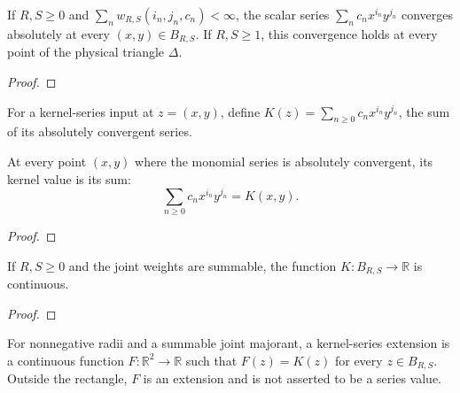 \begin{supporting}
\begin{theorem}
\label{thm:volterra-series-kernel-input}
\leanok
If $R,S\ge0$ and $\sum_n w_{R,S}(i_n,j_n,c_n)<\infty$, the scalar series $\sum_n c_n x^{i_n}y^{j_n}$ converges absolutely at every $(x,y)\in B_{R,S}$.
If $R,S\ge1$, this convergence holds at every point of the physical triangle $\Delta$.
\end{theorem}
\begin{proof}
\leanok
\end{proof}

\begin{definition}
\label{def:volterra-series-kernel}
\leanok
For a kernel-series input at $z=(x,y)$, define
$K(z)=\sum_{n\ge0}c_nx^{i_n}y^{j_n}$, the sum of its absolutely convergent series.
\end{definition}

\begin{theorem}
\label{thm:volterra-series-kernel-value}
\leanok
At every point $(x,y)$ where the monomial series is absolutely convergent,
its kernel value is its sum:
\[
 \sum_{n\ge0}c_n x^{i_n}y^{j_n}=K(x,y).
\]
\end{theorem}
\begin{proof}
\leanok
\end{proof}

\begin{theorem}
\label{thm:volterra-series-kernel-continuity}
\leanok
If $R,S\ge0$ and the joint weights are summable, the function
$K:B_{R,S}\to\mathbb R$ is continuous.
\end{theorem}
\begin{proof}
\leanok
\end{proof}

\begin{definition}
\label{def:volterra-series-kernel-extension}
\leanok
For nonnegative radii and a summable joint majorant, a kernel-series extension
is a continuous function $F:\mathbb R^2\to\mathbb R$ such that
$F(z)=K(z)$ for every $z\in B_{R,S}$.
Outside the rectangle, $F$ is an extension and is not asserted to be a series value.
\end{definition}


\end{supporting}

